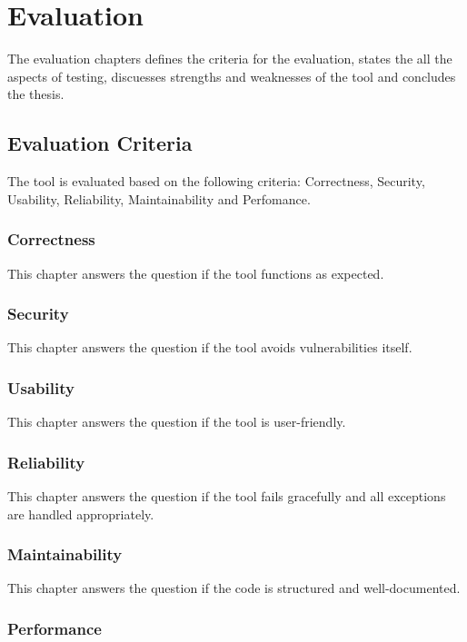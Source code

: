 \section{Evaluation}

The evaluation chapters defines the criteria for the evaluation, states the all the aspects of testing, discuesses strengths and weaknesses of the tool and concludes the thesis.

\subsection{Evaluation Criteria}

The tool is evaluated based on the following criteria: Correctness, Security, Usability, Reliability, Maintainability and Perfomance.

\subsubsection{Correctness}

This chapter answers the question if the tool functions as expected.

\subsubsection{Security}

This chapter answers the question if the tool avoids vulnerabilities itself.

\subsubsection{Usability}

This chapter answers the question if the tool is user-friendly.

\subsubsection{Reliability}

This chapter answers the question if the tool fails gracefully and all exceptions are handled appropriately.

\subsubsection{Maintainability}

This chapter answers the question if the code is structured and well-documented.

\subsubsection{Performance} 

